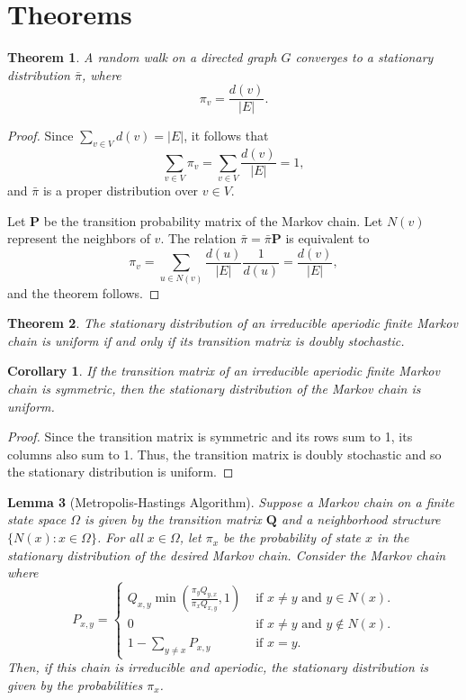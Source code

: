 \documentclass{article}
\newtheorem{theorem}{Theorem}[section]
\newtheorem{corollary}{Corollary}[theorem]
\newtheorem{lemma}[theorem]{Lemma}
\begin{document}
\section{Theorems}

\begin{theorem}
    A random walk on a directed graph $G$ converges to a stationary
    distribution $\bar{\pi}$, where \[\pi_v = \frac{d(v)}{|E|}.\]
\end{theorem}

\begin{proof}
    Since $\sum_{v \in V} d(v) = |E|$, it follows that \[\sum_{v \in V} \pi_v
    = \sum_{v \in V} \frac{d(v)}{|E|} = 1,\] and $\bar{\pi}$ is a proper
    distribution over $v \in V$.

    Let $\mathbf{P}$ be the transition probability matrix of the Markov chain.
    Let $N(v)$ represent the neighbors of $v$. The relation $\bar{\pi} =
    \bar{\pi} \mathbf{P}$ is equivalent to \[\pi_v = \sum_{u \in N(v)}
    \frac{d(u)}{|E|} \frac{1}{d(u)} = \frac{d(v)}{|E|},\] and the theorem
    follows.
\end{proof}

\begin{theorem}
    The stationary distribution of an irreducible aperiodic finite Markov chain
    is uniform if and only if its transition matrix is doubly stochastic.
\end{theorem}

\begin{corollary}
    If the transition matrix of an irreducible aperiodic finite Markov chain is
    symmetric, then the stationary distribution of the Markov chain is uniform.
\end{corollary}

\begin{proof}
    Since the transition matrix is symmetric and its rows sum to 1, its columns
    also sum to 1. Thus, the transition matrix is doubly stochastic and so the
    stationary distribution is uniform.
\end{proof}

\begin{lemma}[Metropolis-Hastings Algorithm]
    Suppose a Markov chain on a finite state space $\Omega$ is given by the
    transition matrix $\mathbf{Q}$ and a neighborhood structure $\{N(x) : x \in
    \Omega\}$.  For all $x \in \Omega$, let $\pi_x$ be the probability of state
    $x$ in the stationary distribution of the desired Markov chain. Consider
    the Markov chain where
    \[
    P_{x, y} = \begin{cases}
        Q_{x, y} \min\left(\frac{\pi_y Q_{y, x}}{\pi_x Q_{x, y}}, 1\right) &
        \text{ if } x \neq y \text{ and } y \in N(x). \\
        0 & \text{ if } x \neq y \text{ and } y \notin N(x). \\
        1 - \sum_{y \neq x} P_{x, y} & \text{ if } x = y.
    \end{cases}
    \]
    Then, if this chain is irreducible and aperiodic, the stationary
    distribution is given by the probabilities $\pi_x$.
\end{lemma}
\end{document}
